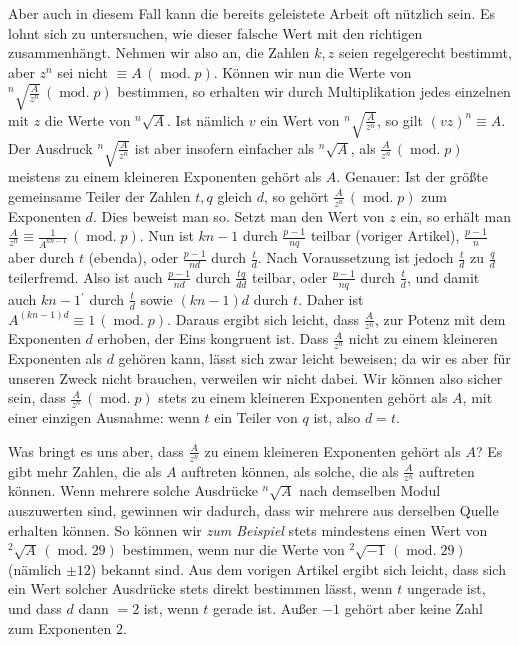 Aber auch in diesem Fall kann die bereits geleistete Arbeit oft nützlich sein. Es lohnt sich zu untersuchen, wie dieser falsche Wert mit den richtigen zusammenhängt. Nehmen wir also an, die Zahlen $k,z$ seien regelgerecht bestimmt, aber $z^n$ sei nicht $\equiv A\,(\operatorname{mod.}p)$. Können wir nun die Werte von ${}^{n}\!\surd{\frac{A}{z^n}}\,(\operatorname{mod.}p)$ bestimmen, so erhalten wir durch Multiplikation jedes einzelnen mit $z$ die Werte von ${}^{n}\!\surd{A}$. Ist nämlich $v$ ein Wert von ${}^{n}\!\surd{\frac{A}{z^n}}$, so gilt $(vz)^n\equiv A$. Der Ausdruck ${}^{n}\!\surd{\frac{A}{z^n}}$ ist aber insofern einfacher als ${}^{n}\!\surd{A}$, als $\frac{A}{z^n}\,(\operatorname{mod.}p)$ meistens zu einem kleineren Exponenten gehört als $A$. Genauer: Ist der größte gemeinsame Teiler der Zahlen $t,q$ gleich $d$, so gehört $\frac{A}{z^n}\,(\operatorname{mod.}p)$ zum Exponenten $d$. Dies beweist man so. Setzt man den Wert von $z$ ein, so erhält man $\frac{A}{z^n}\equiv\frac{1}{A^{kn-1}}\,(\operatorname{mod.}p)$. Nun ist $kn-1$ durch $\frac{p-1}{nq}$ teilbar (voriger Artikel), $\frac{p-1}{n}$ aber durch $t$ (ebenda), oder $\frac{p-1}{nd}$ durch $\frac{t}{d}$. Nach Voraussetzung ist jedoch $\frac{t}{d}$ zu $\frac{q}{d}$ teilerfremd. Also ist auch $\frac{p-1}{nd}$ durch $\frac{tq}{dd}$ teilbar, oder $\frac{p-1}{nq}$ durch $\frac{t}{d}$, und damit auch $kn-1{}^{\prime}$ durch $\frac{t}{d}$ sowie $(kn-1)d$ durch $t$. Daher ist $A^{(kn-1)d}\equiv1\,(\operatorname{mod.}p)$. Daraus ergibt sich leicht, dass $\frac{A}{z^n}$, zur Potenz mit dem Exponenten $d$ erhoben, der Eins kongruent ist. Dass $\frac{A}{z^n}$ nicht zu einem kleineren Exponenten als $d$ gehören kann, lässt sich zwar leicht beweisen; da wir es aber für unseren Zweck nicht brauchen, verweilen wir nicht dabei. Wir können also sicher sein, dass $\frac{A}{z^n}\,(\operatorname{mod.}p)$ stets zu einem kleineren Exponenten gehört als $A$, mit einer einzigen Ausnahme: wenn $t$ ein Teiler von $q$ ist, also $d=t$.

Was bringt es uns aber, dass $\frac{A}{z^n}$ zu einem kleineren Exponenten gehört als $A$? Es gibt mehr Zahlen, die als $A$ auftreten können, als solche, die als $\frac{A}{z^n}$ auftreten können. Wenn mehrere solche Ausdrücke ${}^{n}\!\surd{A}$ nach demselben Modul auszuwerten sind, gewinnen wir dadurch, dass wir mehrere aus derselben Quelle erhalten können. So können wir \emph{zum Beispiel} stets mindestens einen Wert von ${}^{2}\!\surd{A}\,(\operatorname{mod.}29)$ bestimmen,
wenn nur die Werte von ${}^{2}\!\surd{-1}\,(\operatorname{mod.}29)$ (nämlich $\pm12$) bekannt sind. Aus dem vorigen Artikel ergibt sich leicht, dass sich ein Wert solcher Ausdrücke stets direkt bestimmen lässt, wenn $t$ ungerade ist, und dass $d$ dann $=2$ ist, wenn $t$ gerade ist. Außer $-1$ gehört aber keine Zahl zum Exponenten $2$.

